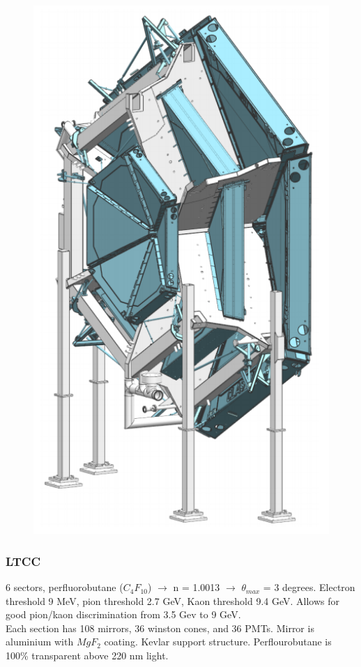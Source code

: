             									
			 \begin{figure}[H]
    			\centering
    			\includegraphics[width=12cm]{Chapters/Ch2-Experiment/clas-12-system/pics/fd/drift-chambers.PNG}
			\end{figure}    

            
        \subsubsection{LTCC}
            6 sectors, perfluorobutane ($C_4F_10$) $\longrightarrow$ n = 1.0013 $\longrightarrow$ $\theta_{max}$ = 3 degrees. Electron threshold 9 MeV, pion threshold 2.7 GeV, Kaon threshold 9.4 GeV. Allows for good pion/kaon discrimination from 3.5 Gev to 9 GeV. \\
            Each section has 108 mirrors, 36 winston cones, and 36 PMTs. Mirror is aluminium with $MgF_2$ coating. Kevlar support structure. Perflourobutane is 100\% transparent above 220 nm light. 
            
